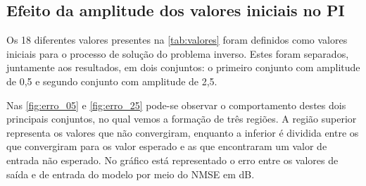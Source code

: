 
\subsection{Efeito da amplitude dos valores iniciais no PI} \label{subsec:estudoi-pi-efeito}
Os 18 diferentes valores presentes na \autoref{tab:valores} foram definidos como valores iniciais para o processo de solução do problema inverso. Estes foram separados, juntamente aos resultados, em dois conjuntos: o primeiro conjunto com amplitude de 0,5 e segundo conjunto com amplitude de 2,5.

Nas \autoref{fig:erro_05} e \autoref{fig:erro_25} pode-se observar o comportamento destes dois principais conjuntos, no qual vemos a formação de três regiões. A região superior representa os valores que não convergiram, enquanto a inferior é dividida entre os que convergiram para os valor esperado e as que encontraram um valor de entrada não esperado. No gráfico está representado o erro entre os valores de saída e de entrada do modelo por meio do NMSE em dB.

